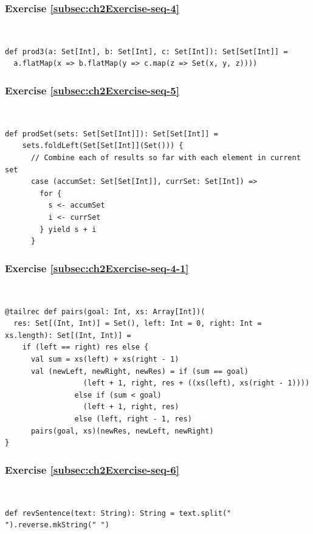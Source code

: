\subsubsection*{Exercise \ref{subsec:ch2Exercise-seq-4}}

~
\begin{lstlisting}
def prod3(a: Set[Int], b: Set[Int], c: Set[Int]): Set[Set[Int]] =
  a.flatMap(x => b.flatMap(y => c.map(z => Set(x, y, z))))
\end{lstlisting}


\subsubsection*{Exercise \ref{subsec:ch2Exercise-seq-5}}

~
\begin{lstlisting}
def prodSet(sets: Set[Set[Int]]): Set[Set[Int]] =
    sets.foldLeft(Set[Set[Int]](Set())) {
      // Combine each of results so far with each element in current set
      case (accumSet: Set[Set[Int]], currSet: Set[Int]) =>
        for {
          s <- accumSet
          i <- currSet
        } yield s + i
      }
\end{lstlisting}


\subsubsection*{Exercise \ref{subsec:ch2Exercise-seq-4-1}}

~
\begin{lstlisting}
@tailrec def pairs(goal: Int, xs: Array[Int])(
  res: Set[(Int, Int)] = Set(), left: Int = 0, right: Int = xs.length): Set[(Int, Int)] =
    if (left == right) res else {
      val sum = xs(left) + xs(right - 1)
      val (newLeft, newRight, newRes) = if (sum == goal) 
                  (left + 1, right, res + ((xs(left), xs(right - 1)))) 
                else if (sum < goal)
                  (left + 1, right, res)
                else (left, right - 1, res)
      pairs(goal, xs)(newRes, newLeft, newRight)
}
\end{lstlisting}


\subsubsection*{Exercise \ref{subsec:ch2Exercise-seq-6}}

~
\begin{lstlisting}
def revSentence(text: String): String = text.split(" ").reverse.mkString(" ")
\end{lstlisting}


